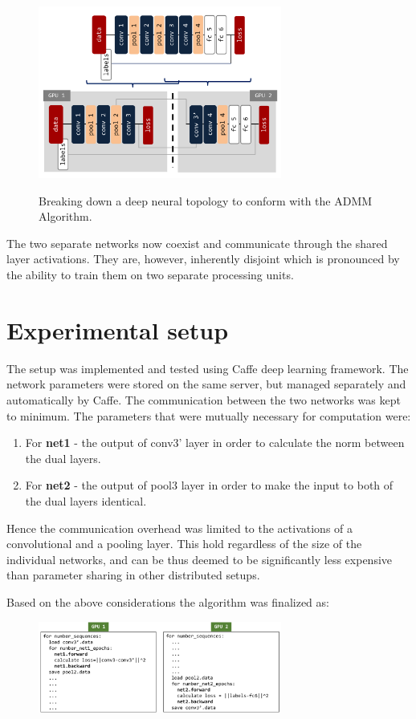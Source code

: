 \documentclass[letterpaper]{article}
\begin{document}
\begin{figure}[h]
	{\includegraphics[width=3.15in]{broken}}
	\caption{Breaking down a deep neural topology to conform with the ADMM Algorithm.}
	\label{broken}
\end{figure}

The two separate networks now coexist and communicate through the shared layer activations. They are, however, inherently disjoint which is pronounced by the ability to train them on two separate processing units.

\section{Experimental setup}

The setup was implemented and tested using Caffe deep learning framework. The network parameters were stored on the same server, but managed separately and automatically by Caffe. The communication between the two networks was kept to minimum. 
The parameters that were mutually necessary for computation were:
\begin{enumerate}
	\item For \textbf{net1} - the output of conv3' layer in order to calculate the norm between the dual layers.
	\item For \textbf{net2} - the output of pool3 layer in order to make the input to both of the dual layers identical.
\end{enumerate}

Hence the communication overhead was limited to the activations of a convolutional and a pooling layer. This hold regardless of the size of the individual networks, and can be thus deemed to be significantly less expensive than parameter sharing in other distributed setups.

Based on the above considerations the algorithm was finalized as:
\begin{figure}[h]
	{\includegraphics[width=3.15in]{algocode_revisited}}
\end{figure}
\end{document}
